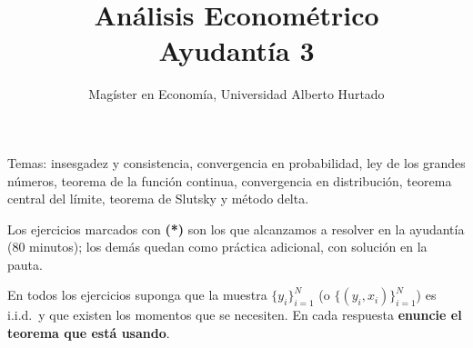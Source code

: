 \documentclass[letterpaper,11pt]{article}
\title{Análisis Econométrico \\ Ayudantía 3}
\author{Magíster en Economía, Universidad Alberto Hurtado}
\date{}
\begin{document}
\maketitle

\noindent Temas: insesgadez y consistencia, convergencia en probabilidad, ley de los grandes
números, teorema de la función continua, convergencia en distribución, teorema central del
límite, teorema de Slutsky y método delta.

\medskip
\noindent Los ejercicios marcados con \textbf{(*)} son los que alcanzamos a resolver en la
ayudantía (80 minutos); los demás quedan como práctica adicional, con solución en la pauta.

\medskip
\noindent En todos los ejercicios suponga que la muestra $\{y_i\}_{i=1}^N$ (o
$\{(y_i,x_i)\}_{i=1}^N$) es i.i.d.\ y que existen los momentos que se necesiten. En cada
respuesta \textbf{enuncie el teorema que está usando}.
\end{document}
